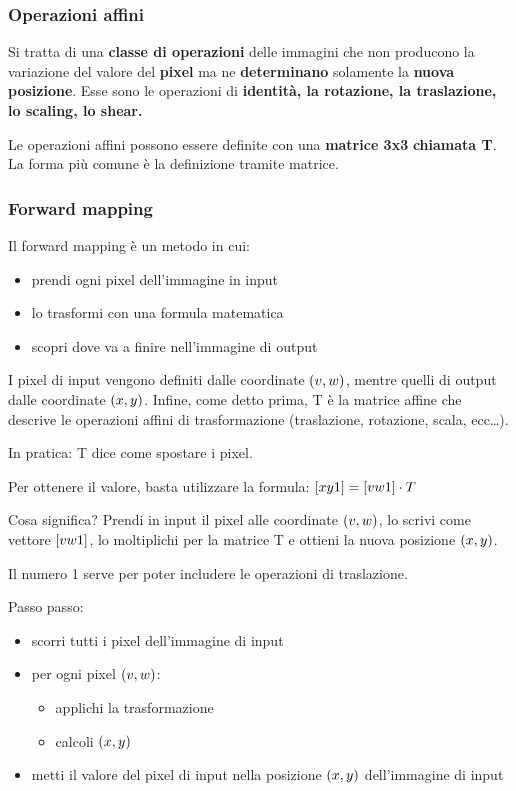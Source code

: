 \subsubsection{Operazioni affini}\label{operazioni-affini}

Si tratta di una \textbf{classe di operazioni} delle immagini che non
producono la variazione del valore del \textbf{pixel} ma ne
\textbf{determinano} solamente la \textbf{nuova posizione}. Esse sono le
operazioni di \textbf{identità, la rotazione, la traslazione, lo
scaling, lo shear.}

Le operazioni affini possono essere definite con una \textbf{matrice
3x3} \textbf{chiamata T}. La forma più comune è la definizione tramite
matrice.

\subsubsection{Forward mapping}\label{forward-mapping}

Il forward mapping è un metodo in cui:

\begin{itemize}
\tightlist
\item
  prendi ogni pixel dell'immagine in input
\item
  lo trasformi con una formula matematica
\item
  scopri dove va a finire nell'immagine di output
\end{itemize}

I pixel di input vengono definiti dalle coordinate \((v, \space w)\),
mentre quelli di output dalle coordinate \((x, \space y)\). Infine, come
detto prima, T è la matrice affine che descrive le operazioni affini di
trasformazione (traslazione, rotazione, scala, ecc\ldots).

In pratica: T dice come spostare i pixel.

Per ottenere il valore, basta utilizzare la formula:
\([x \space y \space 1] = [v \space w \space 1] \cdot T\)

Cosa significa? Prendi in input il pixel alle coordinate
\((v, \space w)\), lo scrivi come vettore \([v \space w \space 1]\), lo
moltiplichi per la matrice T e ottieni la nuova posizione
\((x, \space y)\).

Il numero 1 serve per poter includere le operazioni di traslazione.

Passo passo:

\begin{itemize}
\tightlist
\item
  scorri tutti i pixel dell'immagine di input
\item
  per ogni pixel \((v, \space w)\):

  \begin{itemize}
  \tightlist
  \item
    applichi la trasformazione
  \item
    calcoli \((x, \space y)\)
  \end{itemize}
\item
  metti il valore del pixel di input nella posizione \((x, \space y)\)
  dell'immagine di input
\end{itemize}

